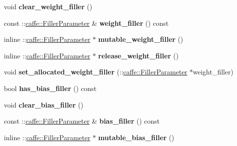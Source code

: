 \begin{DoxyCompactItemize}
void {\bfseries clear\+\_\+weight\+\_\+filler} ()
\item 
\mbox{\label{classcaffe_1_1_v0_layer_parameter_a5fb6ae49e6c5d93dd9a271413adb8215}} 
const \+::\mbox{\hyperlink{classcaffe_1_1_filler_parameter}{caffe\+::\+Filler\+Parameter}} \& {\bfseries weight\+\_\+filler} () const
\item 
\mbox{\label{classcaffe_1_1_v0_layer_parameter_af412170b2b7acaaa72007290ee31b1ea}} 
inline \+::\mbox{\hyperlink{classcaffe_1_1_filler_parameter}{caffe\+::\+Filler\+Parameter}} $\ast$ {\bfseries mutable\+\_\+weight\+\_\+filler} ()
\item 
\mbox{\label{classcaffe_1_1_v0_layer_parameter_ab58a4ff1ce984eeb860f5ed09892cd09}} 
inline \+::\mbox{\hyperlink{classcaffe_1_1_filler_parameter}{caffe\+::\+Filler\+Parameter}} $\ast$ {\bfseries release\+\_\+weight\+\_\+filler} ()
\item 
\mbox{\label{classcaffe_1_1_v0_layer_parameter_ab747ac0d25ddb2cd3ad19f77ef1f2b7d}} 
void {\bfseries set\+\_\+allocated\+\_\+weight\+\_\+filler} (\+::\mbox{\hyperlink{classcaffe_1_1_filler_parameter}{caffe\+::\+Filler\+Parameter}} $\ast$weight\+\_\+filler)
\item 
\mbox{\label{classcaffe_1_1_v0_layer_parameter_a96f01bf572266a73dd3444130394038c}} 
bool {\bfseries has\+\_\+bias\+\_\+filler} () const
\item 
\mbox{\label{classcaffe_1_1_v0_layer_parameter_aa1bdd435aa8e213bacf9475d2c0c0dd5}} 
void {\bfseries clear\+\_\+bias\+\_\+filler} ()
\item 
\mbox{\label{classcaffe_1_1_v0_layer_parameter_a5879d3d4d4a70b7448b191d4c8ae6000}} 
const \+::\mbox{\hyperlink{classcaffe_1_1_filler_parameter}{caffe\+::\+Filler\+Parameter}} \& {\bfseries bias\+\_\+filler} () const
\item 
\mbox{\label{classcaffe_1_1_v0_layer_parameter_ad5240ff059e74b1892c7a8faea79ac2d}} 
inline \+::\mbox{\hyperlink{classcaffe_1_1_filler_parameter}{caffe\+::\+Filler\+Parameter}} $\ast$ {\bfseries mutable\+\_\+bias\+\_\+filler} ()

\end{DoxyCompactItemize}
